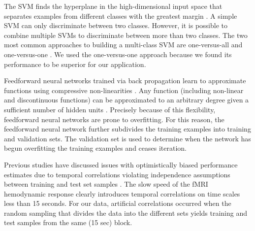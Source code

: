 \documentclass[review,1p,authoryear]{elsarticle}
\begin{document}
The SVM finds the hyperplane in the high-dimensional input space that separates examples from different classes with the greatest margin \citep{Cortes1995}.
A simple SVM can only discriminate between two classes.
However, it is possible to combine multiple SVMs to discriminate between more than two classes.
The two most common approaches to building a multi-class SVM are one-versus-all and one-versus-one \citep{Weston1999}.
We used the one-versus-one approach because we found its performance to be superior for our application.

Feedforward neural networks trained via back propagation learn to approximate functions using compressive non-linearities \citep{Hagan1994}.
Any function (including non-linear and discontinuous functions) can be approximated to an arbitrary degree given a sufficient number of hidden units \citep{Hornik1989}.
Precisely because of this flexibility, feedforward neural networks are prone to overfitting.
For this reason, the feedforward neural network further subdivides the training examples into training and validation sets.
The validation set is used to determine when the network has begun overfitting the training examples and ceases iteration.

Previous studies have discussed issues with optimistically biased performance estimates due to temporal correlations violating independence assumptions between training and test set samples \citep{Pereira2009}. The slow speed of the fMRI hemodynamic response clearly introduces temporal correlations on time scales less than 15 seconds.
For our data, artificial correlations occurred when the random sampling that divides the data into the different sets yields training and test samples from the same (15 sec) block.
\end{document}
